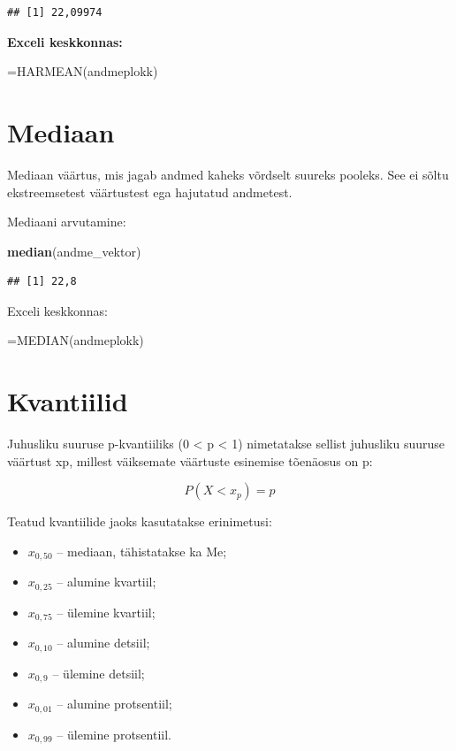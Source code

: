 \documentclass[
]{book}
\newenvironment{Shaded}{\begin{snugshade}}{\end{snugshade}}
\newcommand{\FunctionTok}[1]{\textcolor[rgb]{0.13,0.29,0.53}{\textbf{#1}}}
\newcommand{\NormalTok}[1]{#1}
\providecommand{\tightlist}{%
  \setlength{\itemsep}{0pt}\setlength{\parskip}{0pt}}
\renewenvironment{Shaded} {\begin{snugshade}\footnotesize} {\end{snugshade}}
\begin{document}
\begin{verbatim}
## [1] 22,09974
\end{verbatim}

\textbf{Exceli keskkonnas:}

\begin{Shaded}
\begin{Highlighting}[]
\NormalTok{=HARMEAN(andmeplokk)}
\end{Highlighting}
\end{Shaded}

\section{Mediaan}\label{mediaan}

Mediaan väärtus, mis jagab andmed kaheks võrdselt suureks pooleks. See ei sõltu ekstreemsetest väärtustest ega hajutatud andmetest.

Mediaani arvutamine:

\begin{Shaded}
\begin{Highlighting}[]
\FunctionTok{median}\NormalTok{(andme\_vektor)}
\end{Highlighting}
\end{Shaded}

\begin{verbatim}
## [1] 22,8
\end{verbatim}

Exceli keskkonnas:

\begin{Shaded}
\begin{Highlighting}[]
\NormalTok{=MEDIAN(andmeplokk)}
\end{Highlighting}
\end{Shaded}

\section{Kvantiilid}\label{kvantiilid}

Juhusliku suuruse p-kvantiiliks (0 \textless{} p \textless{} 1) nimetatakse sellist juhusliku suuruse väärtust xp, millest väiksemate väärtuste esinemise tõenäosus on p:

\[ P (X < x_p) = p \]

Teatud kvantiilide jaoks kasutatakse erinimetusi:

\begin{itemize}
\tightlist
\item
  \(x_{0,50}\) -- mediaan, tähistatakse ka Me;
\item
  \(x_{0,25}\) -- alumine kvartiil;
\item
  \(x_{0,75}\) -- ülemine kvartiil;
\item
  \(x_{0,10}\) -- alumine detsiil;
\item
  \(x_{0,9}\) -- ülemine detsiil;
\item
  \(x_{0,01}\) -- alumine protsentiil;
\item
  \(x_{0,99}\) -- ülemine protsentiil.
\end{itemize}
\end{document}
